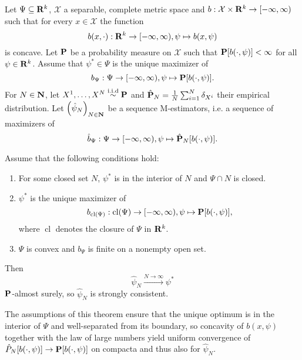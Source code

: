 \begin{theorem}
    \label{thm:haberman-consistent}
    Let $\Psi \subseteq \R^{k}$, $\mathcal X$ a separable, complete metric space and $b: \mathcal X \times \R^{k} \to [- \infty, \infty )$ such that for every $x \in \mathcal X$ the function $$b(x, \cdot): \R^{k} \to [-\infty, \infty), \psi \mapsto b(x, \psi)$$ is concave. Let $\P$ be a probability measure on $\mathcal X$ such that $\P [b(\cdot, \psi)] < \infty$  for all $\psi \in \R^{k}$. Assume that $\psi^{\ast} \in \Psi$ is the unique maximizer of $$b_{\Psi}: \Psi \to [-\infty, \infty), \psi \mapsto \P [b(\cdot,\psi)].$$ For $N\in\N$, let $X^{1}, \dots, X^{N}  \iid \P$ and $\hat \P_{N} = \frac{1}{N} \sum_{i = 1}^N \delta_{X^{i}}$ their empirical distribution. Let $\left(\hat\psi_{N}\right)_{N \in \N}$ be a sequence M-estimators, i.e. a sequence of maximizers of
    $$
    \hat b_{\Psi}: \Psi \to [-\infty, \infty), \psi \mapsto \hat \P_{N} [b(\cdot, \psi)].
    $$
    
    Assume that the following conditions hold:
    \begin{enumerate}[label=(C\arabic*),ref=(C\arabic*)]
        \item\label{it:C1} For some closed set $N$, $\psi^{\ast}$ is in the interior of $N$ and $\Psi \cap N$ is closed. 
        \item\label{it:C2} $\psi^{\ast}$ is the unique maximizer of $$b_{\operatorname{cl} (\Psi)}: \operatorname{cl} (\Psi) \to [-\infty, \infty), \psi \mapsto \P [b(\cdot, \psi)],$$ where $ \operatorname{cl}$ denotes the closure of $\Psi$ in $\R^{k}$.
        \item\label{it:C3} $\Psi$ is convex and $b_{\Psi}$ is finite on a nonempty open set.
    \end{enumerate}

    Then $$\hat \psi_{N} \stackrel{N \to \infty}\to \psi^{\ast}$$ $\P$-almost surely, so $\hat\psi_{N}$ is strongly consistent.
\end{theorem}

The assumptions of this theorem ensure that the unique optimum is in the interior of $\Psi$ and \glqq{}well-separated\grqq{} from its boundary, so concavity of $b(x, \psi)$ together with the law of large numbers yield uniform convergence of $\hat P_{N} [b(\cdot, \psi)] \to \P [b(\cdot, \psi)]$ on compacta and thus also for $\hat\psi_{N}$.

